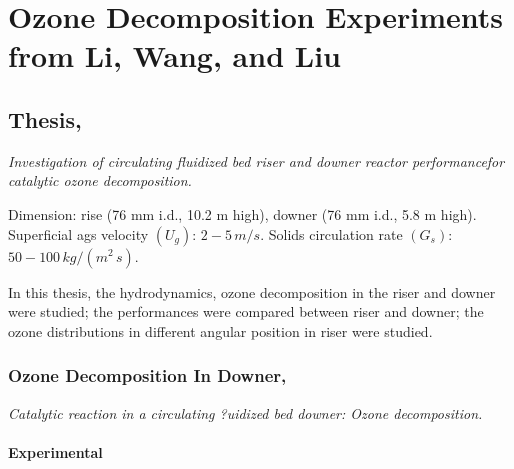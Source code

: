 %
%
%
\chapter{Ozone Decomposition Experiments from Li, Wang, and Liu}
\section[Li, Dongbing, 2010]{Thesis, \cite{li2010}}
\textit{Investigation of circulating fluidized bed riser and downer reactor performancefor catalytic ozone decomposition.}

Dimension: rise (76 mm i.d., 10.2 m high), downer (76 mm i.d., 5.8 m high). Superficial ags velocity $(U_g)$: $2-5\,\si{m/s}$. 
Solids circulation rate $(G_s)$: $50-100\,\si{kg/(m^2\,s)}$.

In this thesis, the hydrodynamics, ozone decomposition in the riser and downer were studied; 
the performances were compared between riser and downer; 
the ozone distributions in different angular position in riser were studied.

\subsection[Ozone Decomposition In Downer, 2011]{Ozone Decomposition In Downer, \cite{li2011catalytic}}
\textit{Catalytic reaction in a circulating ?uidized bed downer: Ozone decomposition.}
\subsubsection{Experimental}
